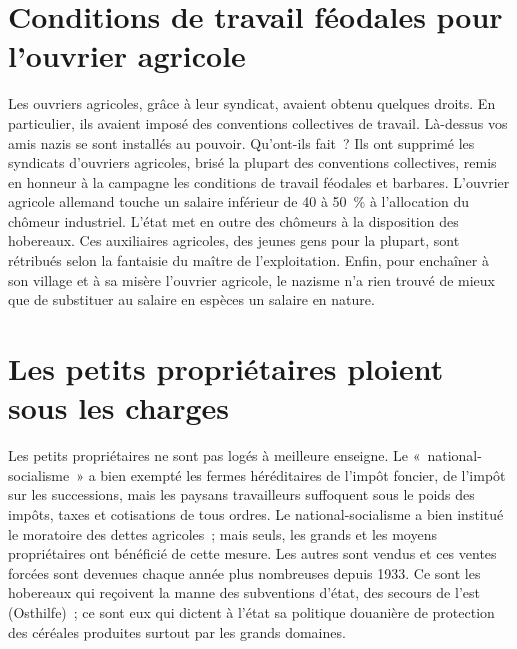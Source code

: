\documentclass[french,twoside]{book} %
\begin{document}
\section[{Conditions de travail féodales pour l’ouvrier agricole}]{Conditions de travail féodales pour l’ouvrier agricole}
\noindent Les ouvriers agricoles, grâce à leur syndicat, avaient obtenu quelques droits. En particulier, ils avaient imposé des conventions collectives de travail. Là-dessus vos amis nazis se sont installés au pouvoir. Qu’ont-ils fait ? Ils ont supprimé les syndicats d’ouvriers agricoles, brisé la plupart des conventions collectives, remis en honneur à la campagne les conditions de travail féodales et barbares. L’ouvrier agricole allemand touche un salaire inférieur de 40 à 50 \% à l’allocation du chômeur industriel. L’état met en outre des chômeurs à la disposition des hobereaux. Ces auxiliaires agricoles, des jeunes gens pour la plupart, sont rétribués selon la fantaisie du maître de l’exploitation. Enfin, pour enchaîner à son village et à sa misère l’ouvrier agricole, le nazisme n’a rien trouvé de mieux que de substituer au salaire en espèces un salaire en nature.
\section[{Les petits propriétaires ploient sous les charges}]{Les petits propriétaires ploient sous les charges}
\noindent Les petits propriétaires ne sont pas logés à meilleure enseigne. Le « national-socialisme » a bien exempté les fermes héréditaires de l’impôt foncier, de l’impôt sur les successions, mais les paysans travailleurs suffoquent sous le poids des impôts, taxes et cotisations de tous ordres. Le national-socialisme a bien institué le moratoire des dettes agricoles ; mais seuls, les grands et les moyens propriétaires ont bénéficié de cette mesure. Les autres sont vendus et ces ventes forcées sont devenues chaque année plus nombreuses depuis 1933. Ce sont les hobereaux qui reçoivent la manne des subventions d’état, des secours de l’est (Osthilfe) ; ce sont eux qui dictent à l’état sa politique douanière de protection des céréales produites surtout par les grands domaines.
\end{document}
